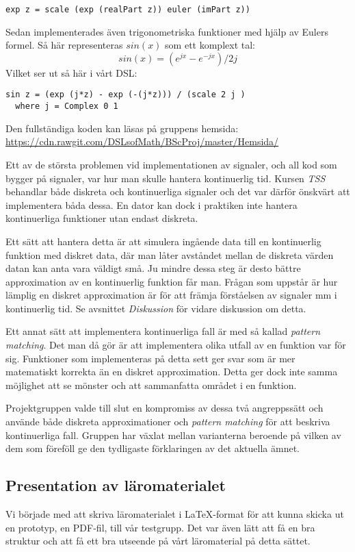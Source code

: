 \documentclass[]{article}
\begin{document}
\begin{verbatim}
exp z = scale (exp (realPart z)) euler (imPart z))
\end{verbatim}
Sedan implementerades även trigonometriska funktioner med hjälp av Eulers
formel. Så här representeras $sin(x)$ som ett komplext tal:
\[ sin(x) = (e^{j x} - e^{-j x}) / 2 j \]
Vilket ser ut så här i vårt DSL:
\begin{verbatim}
sin z = (exp (j*z) - exp (-(j*z))) / (scale 2 j )
  where j = Complex 0 1
\end{verbatim}

Den fullständiga koden kan läsas på gruppens hemsida:
\url{https://cdn.rawgit.com/DSLsofMath/BScProj/master/Hemsida/}

Ett av de största problemen vid implementationen av signaler, och all kod som bygger på signaler, var hur man
skulle hantera kontinuerlig tid. Kursen \textit{TSS} behandlar både diskreta och kontinuerliga signaler och det var
därför önskvärt att implementera båda dessa. En dator kan dock i praktiken inte hantera kontinuerliga funktioner utan
endast diskreta.

Ett sätt att hantera detta är att simulera ingående data till en  kontinuerlig funktion med diskret data, där
man låter avståndet mellan de diskreta värden datan kan anta vara väldigt små. Ju mindre dessa steg är desto bättre
approximation av en kontinuerlig funktion får man. Frågan som uppstår är hur lämplig en diskret approximation är för
att främja förståelsen av signaler mm i kontinuerlig tid. Se avsnittet \textit{Diskussion} för vidare diskussion om detta.

Ett annat sätt att implementera kontinuerliga fall är med så kallad \textit{pattern matching}. Det man då gör är att
implementera olika utfall av en funktion var för sig. Funktioner som implementeras på detta sett ger svar som är mer
matematiskt korrekta än en diskret approximation. Detta ger dock inte samma möjlighet att se mönster och att sammanfatta
området i en funktion.

Projektgruppen valde till slut en kompromiss av dessa två angreppssätt och använde både diskreta approximationer och
\textit{pattern matching} för att beskriva kontinuerliga fall. Gruppen har växlat mellan varianterna beroende på vilken
av dem som föreföll ge den tydligaste förklaringen av det aktuella ämnet.

\subsection{Presentation av läromaterialet}
Vi började med att skriva läromaterialet i LaTeX-format för att kunna skicka ut en prototyp, en PDF-fil, till vår 
testgrupp. Det var även lätt att få en bra struktur och att få ett bra utseende på vårt läromaterial på detta sättet. 
\end{document}
